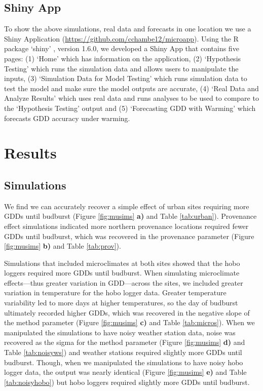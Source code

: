 \documentclass{article}\usepackage[]{graphicx}\usepackage[]{color}
\begin{document}
\subsection*{Shiny App}
To show the above simulations, real data and forecasts in one location we use a Shiny Application (\url{https://github.com/cchambe12/microapp}). Using the R package `shiny' \citep{shiny2021}, version 1.6.0, we developed a Shiny App that contains five pages: (1) `Home' which has information on the application, (2) `Hypothesis Testing' which runs the simulation data and allows users to manipulate the inputs, (3) `Simulation Data for Model Testing' which runs simulation data to test the model and make sure the model outputs are accurate, (4) `Real Data and Analyze Results' which uses real data and runs analyses to be used to compare to the `Hypothesis Testing' output and (5) `Forecasting GDD with Warming' which forecasts GDD accuracy under warming. 

\section*{Results}
\subsection*{Simulations}
We find we can accurately recover a simple effect of urban sites requiring more GDDs until budburst (Figure \ref{fig:musims} \textbf{a)} and Table \ref{tab:urban}). Provenance effect simulations indicated more northern provenance locations required fewer GDDs until budburst, which was recovered in the provenance parameter (Figure \ref{fig:musims} \textbf{b)} and Table \ref{tab:prov}). 

Simulations that included microclimates at both sites showed that the hobo loggers required more GDDs until budburst. When simulating microclimate effects---thus greater variation in GDD---across the sites, we included greater variation in temperature for the hobo logger data. Greater temperature variability led to more days at higher temperatures, so the day of budburst ultimately recorded higher GDDs, which was recovered in the negative slope of the method parameter (Figure \ref{fig:musims} \textbf{c)} and Table \ref{tab:micros}). When we manipulated the simulations to have noisy weather station data, noise was recovered as the sigma for the method parameter (Figure \ref{fig:musims} \textbf{d)} and Table \ref{tab:noisyws}) and weather stations required slightly more GDDs until budburst. Though, when we manipulated the simulations to have noisy hobo logger data, the output was nearly identical (Figure \ref{fig:musims} \textbf{e)} and Table \ref{tab:noisyhobo}) but hobo loggers required slightly more GDDs until budburst.
  
\end{document}
